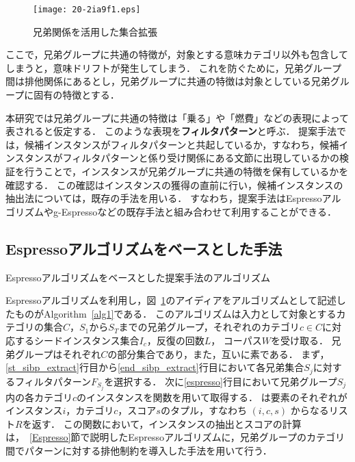 \documentclass[japanese]{jnlp_1.4}
\begin{document}
\begin{figure}[t]
\begin{center}
\texttt{[image: 20-2ia9f1.eps]}
\end{center}
\caption{兄弟関係を活用した集合拡張}
\label{fig:overview}
\end{figure}

ここで，兄弟グループに共通の特徴が，対象とする意味カテゴリ以外も包含してしまうと，意味ドリフトが発生してしまう．
これを防ぐために，兄弟グループ間は排他関係にあるとし，兄弟グループに共通の特徴は対象としている兄弟グループに固有の特徴とする．

本研究では兄弟グループに共通の特徴は「乗る」や「燃費」などの表現によって表されると仮定する．
このような表現を\textbf{フィルタパターン}と呼ぶ．
提案手法では，候補インスタンスがフィルタパターンと共起しているか，すなわち，候補インスタンスがフィルタパターンと係り受け関係にある文節に出現しているかの検証を行うことで，インスタンスが兄弟グループに共通の特徴を保有しているかを確認する．
この確認はインスタンスの獲得の直前に行い，候補インスタンスの抽出法については，既存の手法を用いる．
すなわち，提案手法はEspressoアルゴリズムやg-Espressoなどの既存手法と組み合わせて利用することができる．


\subsection{Espressoアルゴリズムをベースとした手法}\label{proposed_espresso}

\begin{algorithm}[t]
\caption{Espressoアルゴリズムをベースとした提案手法のアルゴリズム}
\label{alg1}

\end{algorithm}


Espressoアルゴリズムを利用し，図~\ref{fig:overview}のアイディアをアルゴリズムとして記述したものがAlgorithm~\ref{alg1}である．
このアルゴリズムは入力として対象とするカテゴリの集合$C$，$S_{1}$から$S_{T}$までの兄弟グループ，それぞれのカテゴリ$c \in C$に対応するシードインスタンス集合$I_{c}$，反復の回数$L$，
コーパス$W$を受け取る．
兄弟グループはそれぞれ$C$の部分集合であり，また，互いに素である．
まず，\ref{st_sibp_extract}行目から\ref{end_sibp_extract}行目において各兄弟集合$S_{j}$に対するフィルタパターン$F_{S_{j}}$を選択する．
次に\ref{espresso}行目において兄弟グループ$S_{j}$内の各カテゴリ$c$のインスタンスを関数を用いて取得する．
は要素のそれぞれがインスタンス$i$，カテゴリ$c$，スコア$s$のタプル，すなわち $(i, c, s)$ からなるリスト$R$を返す．
この関数において，インスタンスの抽出とスコアの計算は，~\ref{Espresso}節で説明したEspressoアルゴリズムに，兄弟グループのカテゴリ間でパターンに対する排他制約を導入した手法を用いて行う．
\end{document}
